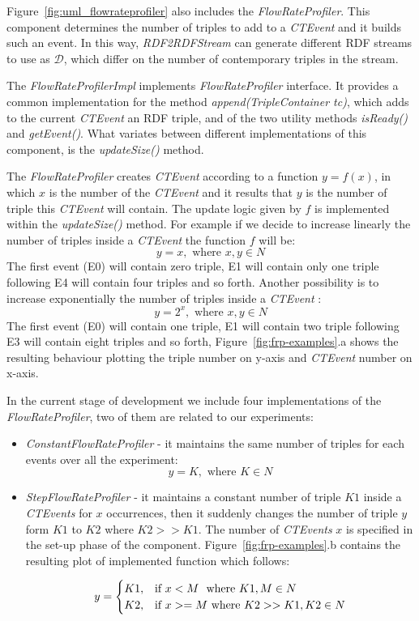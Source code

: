 Figure~\ref{fig:uml_flowrateprofiler} also includes the \textit{FlowRateProfiler}. This component determines the number of triples to add to a \textit{CTEvent} and it builds such an event. In this way, \textit{RDF2RDFStream} can generate different RDF streams to use as $\mathcal{D}$, which differ on the number of contemporary triples in the stream. 



The \textit{FlowRateProfilerImpl} implements \textit{FlowRateProfiler} interface. It provides a common implementation for the method \textit{append(TripleContainer tc)}, which adds to the current \textit{CTEvent} an RDF triple,  and of the two utility methods \textit{isReady()} and \textit{getEvent()}. What variates between different implementations of this component, is the \textit{updateSize()} method. 

The \textit{FlowRateProfiler} creates \textit{CTEvent} according to a function $y=f(x)$, in which $x$ is the number of the \textit{CTEvent} and it results that $y$ is the number of triple this \textit{CTEvent} will contain. The update logic given by $f$ is implemented within the \textit{updateSize()} method. For example if we decide to increase linearly the number of triples inside a \textit{CTEvent} the function $f$ will be: \[y=x, \text{ where } x,y \in N\]
The first event (E0) will contain zero triple, E1 will contain only one triple following E4 will contain four triples and so forth. Another possibility is to increase exponentially the number of triples inside a \textit{CTEvent} : \[y=2^x, \text{ where } x,y \in N\]The first event (E0) will contain one triple, E1 will contain two triple following E3 will contain eight triples and so forth, Figure~\ref{fig:frp-examples}.a shows the resulting behaviour plotting the triple number on y-axis and \textit{CTEvent} number on x-axis.



In the current stage of development we include four implementations of the \textit{FlowRateProfiler}, two of them are related to our experiments: 
\begin{itemize}
\item \textit{ConstantFlowRateProfiler} - it maintains the same number of triples for each events over all the experiment: \\
\[y=K, \text{ where } K \in N \]

\item \textit{StepFlowRateProfiler} - it maintains a constant number of triple $K1$ inside a \textit{CTEvents} for $x$ occurrences, then it suddenly changes the number of triple $y$ form $K1$ to $K2$ where $K2 >> K1$. The number of  \textit{CTEvents} $x$ is specified in the set-up phase of the component.  Figure~\ref{fig:frp-examples}.b contains the resulting plot of implemented function which follows:

\[
y=
\begin{cases}
K1, &\text{if $x < M$ } $ where $ K1, M \in N\\
K2, &\text{if $x >= M$} $ where $ K2 >> K1, K2 \in N
\end{cases}
\]


\end{itemize}

